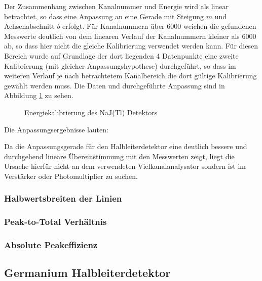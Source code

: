 \documentclass[11pt, a4paper]{article}
\numberwithin{equation}{section}
\begin{document}
Der Zusammenhang zwischen Kanalnummer und Energie wird als linear betrachtet, so dass eine Anpassung an eine Gerade mit Steigung $m$ und Achsenabschnitt $b$ erfolgt.
Für Kanalnummern über \num{6000} weichen die gefundenen Messwerte deutlich von dem linearen Verlauf der Kanalnummern kleiner als \num{6000} ab, so dass hier nicht die gleiche Kalibrierung verwendet werden kann.
Für diesen Bereich wurde auf Grundlage der dort liegenden \num{4} Datenpunkte eine zweite Kalibrierung (mit gleicher Anpassungshypothese) durchgeführt, so dass im weiteren Verlauf je nach betrachtetem Kanalbereich die dort gültige Kalibrierung gewählt werden muss. 
Die Daten und durchgeführte Anpassung sind in Abbildung \ref{fig:kalibrierung_szinti} zu sehen.
\begin{figure}[ht]
	\centering
	
	\caption{Energiekalibrierung des NaJ(Tl) Detektors}
	\label{fig:kalibrierung_szinti}
\end{figure}
Die Anpassungsergebnisse lauten:

Da die Anpassungsgerade für den Halbleiterdetektor eine deutlich bessere und durchgehend lineare Übereinstimmung mit den Messwerten zeigt, liegt die Ursache hierfür nicht an dem verwendeten Vielkanalanalysator sondern ist im Verstärker oder Photomultiplier zu suchen.

\subsubsection{Halbwertsbreiten der Linien}

\subsubsection{Peak-to-Total Verhältnis}

\subsubsection{Absolute Peakeffizienz}



\subsection{Germanium Halbleiterdetektor}
\end{document}
